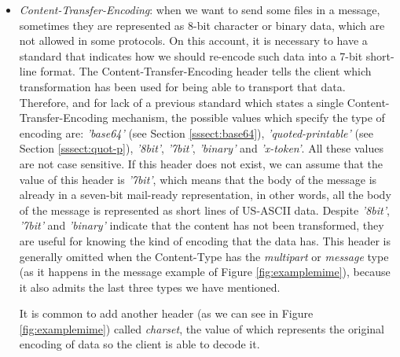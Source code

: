 \begin{itemize}
	\item\textit{Content-Transfer-Encoding}: when we want to send some files in a message, sometimes they are represented as 8-bit character or binary data, which are not allowed in some protocols. On this account, it is necessary to have a standard that indicates how we should re-encode such data into a 7-bit short-line format. The Content-Transfer-Encoding header \citep[Section 5]{rfc1341} tells the client which transformation has been used for being able to transport that data. Therefore, and for lack of a previous standard which states a single Content-Transfer-Encoding mechanism, the possible values which specify the type of encoding are: \textit{'base64'} (see Section \ref{sssect:base64}), \textit{'quoted-printable'} (see Section \ref{sssect:quot-p}), \textit{'8bit'}, \textit{'7bit'}, \textit{'binary'} and \textit{'x-token'}. All these values are not case sensitive. If this header does not exist, we can assume that the value of this header is \textit{'7bit'}, which means that the body of the message is already in a seven-bit mail-ready representation, in other words, all the body of the message is represented as short lines of US-ASCII data. Despite \textit{'8bit'}, \textit{'7bit'} and \textit{'binary'} indicate that the content has not been transformed, they are useful for knowing the kind of encoding that the data has. This header is generally omitted when the Content-Type has the \textit{multipart} or \textit{message} type (as it happens in the message example of Figure \ref{fig:examplemime}), because it also admits the last three types we have mentioned.
	
	It is common to add another header (as we can see in Figure \ref{fig:examplemime}) called \textit{charset}, the value of which represents the original encoding of data so the client is able to decode it.
\end{itemize}

